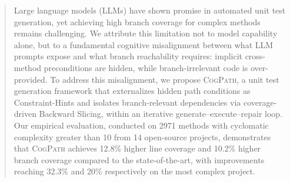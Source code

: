 \begin{abstract}
Large language models (LLMs) have shown promise in automated unit test generation, yet achieving high branch coverage for complex methods remains challenging. 
We attribute this limitation not to model capability alone, but to a fundamental cognitive misalignment between what LLM prompts expose and what branch reachability requires: implicit cross-method preconditions are hidden, while branch-irrelevant code is over-provided. 
To address this misalignment, we propose \textsc{CogPath}, a unit test generation %
framework that externalizes hidden path conditions as Constraint-Hints and isolates branch-relevant dependencies via coverage-driven Backward Slicing, within an iterative generate–execute–repair loop. 
Our empirical evaluation, conducted on 2971 methods with cyclomatic complexity greater than 10 from 14 open-source projects, demonstrates that \textsc{CogPath} achieves 12.8\% higher line coverage and 10.2\% higher branch coverage compared to the state-of-the-art, with improvements reaching 32.3\% and 20\% respectively on the most complex project.

\end{abstract}



